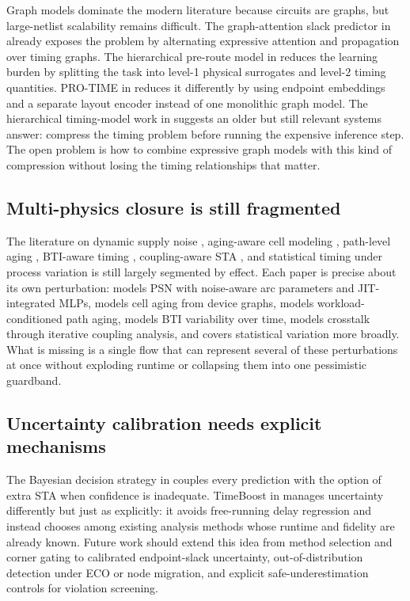 \documentclass[num-refs]{wiley-article}
\begin{document}
  Graph models dominate the modern literature because circuits are graphs, but large-netlist scalability remains difficult. The graph-attention slack predictor in \cite{ref5} already exposes the problem by alternating expressive attention and propagation over timing graphs. The hierarchical pre-route model in \cite{ref17} reduces the learning burden by splitting the task into level-1 physical surrogates and level-2 timing quantities. PRO-TIME in \cite{ref8} reduces it differently by using endpoint embeddings and a separate layout encoder instead of one monolithic graph model. The hierarchical timing-model work in \cite{ref43} suggests an older but still relevant systems answer: compress the timing problem before running the expensive inference step. The open problem is how to combine expressive graph models with this kind of compression without losing the timing relationships that matter.


  \subsection{Multi-physics closure is still fragmented}

  The literature on dynamic supply noise \cite{ref12}, aging-aware cell modeling \cite{ref14}, path-level aging \cite{ref15}, BTI-aware timing \cite{ref44}, coupling-aware STA \cite{ref48}, and statistical timing under process variation \cite{ref49} is still largely segmented by effect. Each paper is precise about its own perturbation: \cite{ref12} models PSN with noise-aware arc parameters and JIT-integrated MLPs, \cite{ref14} models cell aging from device graphs, \cite{ref15} models workload-conditioned path aging, \cite{ref44} models BTI variability over time, \cite{ref48} models crosstalk through iterative coupling analysis, and \cite{ref49} covers statistical variation more broadly. What is missing is a single flow that can represent several of these perturbations at once without exploding runtime or collapsing them into one pessimistic guardband.


  \subsection{Uncertainty calibration needs explicit mechanisms}

  The Bayesian decision strategy in \cite{ref16} couples every prediction with the option of extra STA when confidence is inadequate. TimeBoost in \cite{ref9} manages uncertainty differently but just as explicitly: it avoids free-running delay regression and instead chooses among existing analysis methods whose runtime and fidelity are already known. Future work should extend this idea from method selection and corner gating to calibrated endpoint-slack uncertainty, out-of-distribution detection under ECO or node migration, and explicit safe-underestimation controls for violation screening.
\end{document}

